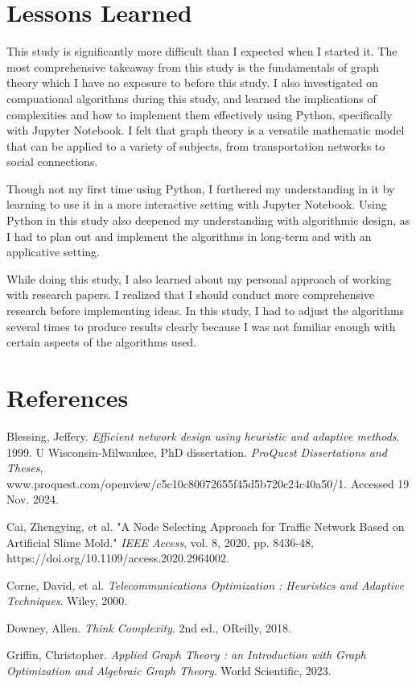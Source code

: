 \documentclass[11pt]{article}
\begin{document}
\section{Lessons Learned}
This study is significantly more difficult than I expected when I started it. The most comprehensive takeaway from this study is the fundamentals of graph theory which I have no exposure to before this study. I also investigated on compuational algorithms during this study, and learned the implications of complexities and how to implement them effectively using Python, specifically with Jupyter Notebook.  I felt that graph theory is a versatile mathematic model that can be applied to a variety of subjects, from transportation networks to social connections. \par
Though not my first time using Python, I furthered my understanding in it by learning to use it in a more interactive setting with Jupyter Notebook. Using Python in this study also deepened my understanding with algorithmic design, as I had to plan out and implement the algorithms in long-term and with an applicative setting. \par
While doing this study, I also learned about my personal approach of working with research papers. I realized that I should conduct more comprehensive research before implementing ideas. In this study, I had to adjust the algorithms several times to produce results clearly because I was not familiar enough with certain aspects of the algorithms used. 
\newpage
\section{References}
Blessing, Jeffery. \emph{Efficient network design using heuristic and
adaptive methods}. 1999. U Wisconsin-Milwaukee, PhD dissertation.
\emph{ProQuest Dissertations and Theses}, \\
www.proquest.com/openview/c5c10c80072655f45d5b720c24c40a50/1. Accessed
19 Nov. 2024.

Cai, Zhengying, et al. "A Node Selecting Approach for Traffic Network
Based on Artificial Slime Mold." \emph{IEEE Access}, vol. 8, 2020, pp.
8436-48, https://doi.org/10.1109/access.2020.2964002.

Corne, David, et al. \emph{Telecommunications Optimization : Heuristics
and Adaptive Techniques}. Wiley, 2000.

Downey, Allen. \emph{Think Complexity}. 2nd ed.,
O\textquotesingle Reilly, 2018.

Griffin, Christopher. \emph{Applied Graph Theory : an Introduction with
Graph Optimization and Algebraic Graph Theory}. World Scientific, 2023.
\end{document}
